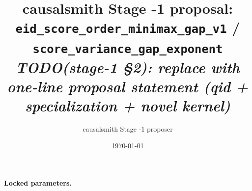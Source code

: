 \documentclass[11pt]{article}
\title{causalsmith Stage -1 proposal: \texttt{eid\_score\_order\_minimax\_gap\_v1} / \texttt{score\_variance\_gap\_exponent}%
  \\ \large\textit{TODO(stage-1 \S2): replace with one-line proposal statement (qid + specialization + novel kernel)}}
\author{causalsmith Stage -1 proposer}
\date{\today}
\theoremstyle{definition}
\theoremstyle{plain}
\theoremstyle{remark}
\begin{document}
\maketitle


\paragraph{Locked parameters.}

\begin{abstract}
\end{abstract}
\end{document}
